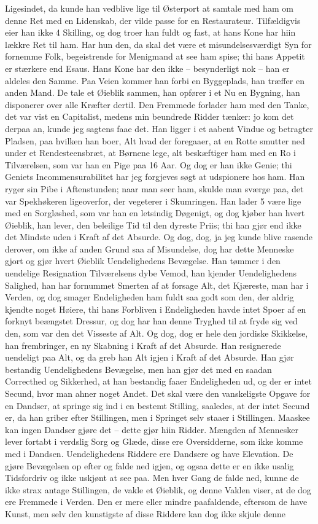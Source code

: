 \documentclass[12pt,a4paper]{article}
\begin{document}
Ligesindet, da kunde han vedblive lige til Østerport at samtale med ham om denne Ret med en Lidenskab, der vilde passe for en Restaurateur. Tilfældigvis eier han ikke 4 Skilling, og dog troer han fuldt og fast, at hans Kone har hiin lækkre Ret til ham. Har hun den, da skal det være et misundelsesværdigt Syn for fornemme Folk, begeistrende for Menigmand at see ham spise; thi hans Appetit er stærkere end Esaus. Hans Kone har den ikke – besynderligt nok – han er aldeles den Samme. Paa Veien kommer han forbi en Byggeplads, han træffer en anden Mand. De tale et Øieblik sammen, han opfører i et Nu en Bygning, han disponerer over alle Kræfter dertil. Den Fremmede forlader ham med den Tanke, det var vist en Capitalist, medens min beundrede Ridder tænker: jo kom det derpaa an, kunde jeg sagtens faae det. Han ligger i et aabent Vindue og betragter Pladsen, paa hvilken han boer, Alt hvad der foregaaer, at en Rotte smutter ned under et Rendesteensbræt, at Børnene lege, alt beskæftiger ham med en Ro i Tilværelsen, som var han en Pige paa 16 Aar. Og dog er han ikke Genie; thi Geniets Incommensurabilitet har jeg forgjeves søgt at udspionere hos ham. Han ryger sin Pibe i Aftenstunden; naar man seer ham, skulde man sværge paa, det var Spekhøkeren ligeoverfor, der vegeterer i Skumringen. Han lader 5 være lige med en Sorgløshed, som var han en letsindig Døgenigt, og dog kjøber han hvert Øieblik, han lever, den beleilige Tid til den dyreste Priis; thi han gjør end ikke det Mindste uden i Kraft af det Absurde. Og dog, dog, ja jeg kunde blive rasende derover, om ikke af anden Grund saa af Misundelse, dog har dette Menneske gjort og gjør hvert Øieblik Uendelighedens Bevægelse. Han tømmer i den uendelige Resignation Tilværelsens dybe Vemod, han kjender Uendelighedens Salighed, han har fornummet Smerten af at forsage Alt, det Kjæreste, man har i Verden, og dog smager Endeligheden ham fuldt saa godt som den, der aldrig kjendte noget Høiere, thi hans Forbliven i Endeligheden havde intet Spoer af en forknyt beængstet Dressur, og dog har han denne Tryghed til at fryde sig ved den, som var den det Visseste af Alt. Og dog, dog er hele den jordiske Skikkelse, han frembringer, en ny Skabning i Kraft af det Absurde. Han resignerede uendeligt paa Alt, og da greb han Alt igjen i Kraft af det Absurde. Han gjør bestandig Uendelighedens Bevægelse, men han gjør det med en saadan Correcthed og Sikkerhed, at han bestandig faaer Endeligheden ud, og der er intet Secund, hvor man ahner noget Andet. Det skal være den vanskeligste Opgave for en Dandser, at springe sig ind i en bestemt Stilling, saaledes, at der intet Secund er, da han griber efter Stillingen, men i Springet selv staaer i Stillingen. Maaskee kan ingen Dandser gjøre det – dette gjør hiin Ridder. Mængden af Mennesker lever fortabt i verdslig Sorg og Glæde, disse ere Oversidderne, som ikke komme med i Dandsen. Uendelighedens Riddere ere Dandsere og have Elevation. De gjøre Bevægelsen op efter og falde ned igjen, og ogsaa dette er en ikke usalig Tidsfordriv og ikke uskjønt at see paa. Men hver Gang de falde ned, kunne de ikke strax antage Stillingen, de vakle et Øieblik, og denne Vaklen viser, at de dog ere Fremmede i Verden. Den er mere eller mindre paafaldende, eftersom de have Kunst, men selv den kunstigste af disse Riddere kan dog ikke skjule denne 
\end{document}
